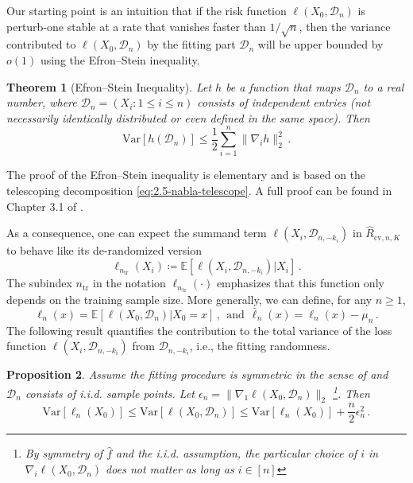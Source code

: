\documentclass[11pt]{article}
\theoremstyle{plain}
\newtheorem{theorem}{Theorem}[section]
\newtheorem{proposition}[theorem]{Proposition}
\newcommand{\cv}{{\mathrm{cv}}}
\newcommand{\tr}{{\mathrm{tr}}}
\newcommand{\D}{{\mathcal{D}}}
\newcommand{\var}{\mathrm{Var}}
\begin{document}
Our starting point is an intuition that if the risk function $\ell(X_0,\D_n)$ is perturb-one stable at a rate that vanishes faster than $1/\sqrt{n}$, then the variance contributed to $\ell(X_0,\D_n)$ by the fitting part $\D_n$ will be upper bounded by $o(1)$ using the Efron--Stein inequality.
\begin{theorem}[Efron--Stein Inequality]\label{thm:4.1-Efron--Stein}
    Let $h$ be a function that maps $\D_n$ to a real number, where $\D_n=(X_i:1\le i\le n)$ consists of independent entries (not necessarily identically distributed or even defined in the same space). Then
    $$\var\left[h(\D_n)\right]\le \frac{1}{2}\sum_{i=1}^n \|\nabla_i h\|_2^2\,.$$
\end{theorem}
The proof of the Efron--Stein inequality is elementary and is based on the telescoping decomposition \eqref{eq:2.5-nabla-telescope}.  A full proof can be found in Chapter 3.1 of \cite{blm}.


As a consequence,  one can expect the summand term $\ell(X_i,\D_{n,-k_i})$ in $\hat R_{\cv,n,K}$ to behave like its de-randomized version
\begin{equation*}
\ell_{n_\tr}(X_i)\coloneqq \mathbb E\left[\ell(X_i,\D_{n,-k_i})|X_i\right]\,.\end{equation*}
The subindex $n_{\tr}$ in the notation $\ell_{n_\tr}(\cdot)$ emphasizes that this function only depends on the training sample size.  More generally, we can define, for any $n\ge 1$,
\begin{equation}\label{eq:4.1-bar-ell}
\ell_n(x) = \mathbb E\left[\ell(X_0,\D_n)|X_0=x\right]\,,~~\text{and}~~
\bar\ell_n(x) = \ell_n(x)-\mu_n\,.
\end{equation}
The following result quantifies the contribution to the total variance of the loss function $\ell(X_i,\D_{n,-k_i})$ from $\D_{n,-k_i}$, i.e., the fitting randomness.
\begin{proposition}
\label{pro:4.1-var-approx}
Assume the fitting procedure is symmetric in the sense of  and $\D_n$ consists of i.i.d. sample points. Let $\epsilon_n=\|\nabla_1\ell(X_0,\D_n)\|_2$ \footnote{By symmetry of $\hat f$ and the i.i.d. assumption, the particular choice of $i$ in $\nabla_i \ell(X_0,\D_n)$ does not matter as long as $i\in[n]$}. Then
$$
\var[\ell_n(X_0)]\le \var[\ell(X_0,\D_n)] \le \var[\ell_n(X_0)]+\frac{n}{2}\epsilon_n^2\,.
$$
\end{proposition}
\end{document}

